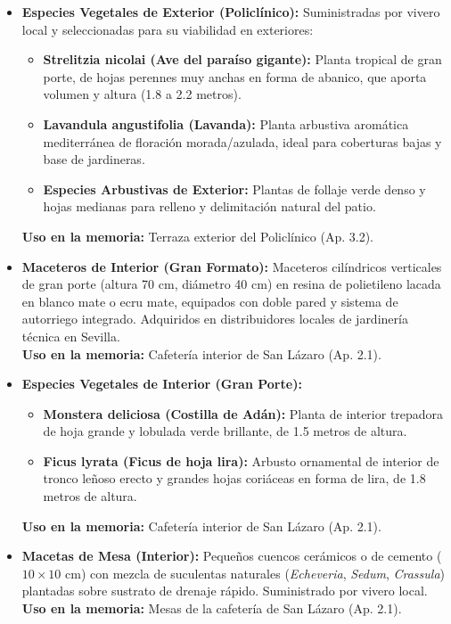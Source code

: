 \documentclass[12pt,a4paper]{article}
\begin{document}
\begin{itemize}
    \item \textbf{Especies Vegetales de Exterior (Policlínico):} Suministradas por vivero local y seleccionadas para su viabilidad en exteriores:
    \begin{itemize}
        \item \textbf{Strelitzia nicolai (Ave del paraíso gigante):} Planta tropical de gran porte, de hojas perennes muy anchas en forma de abanico, que aporta volumen y altura (1.8 a 2.2 metros).
        \item \textbf{Lavandula angustifolia (Lavanda):} Planta arbustiva aromática mediterránea de floración morada/azulada, ideal para coberturas bajas y base de jardineras.
        \item \textbf{Especies Arbustivas de Exterior:} Plantas de follaje verde denso y hojas medianas para relleno y delimitación natural del patio.
    \end{itemize}
    \textbf{Uso en la memoria:} Terraza exterior del Policlínico (Ap. 3.2).
    
    \item \textbf{Maceteros de Interior (Gran Formato):} Maceteros cilíndricos verticales de gran porte (altura 70 cm, diámetro 40 cm) en resina de polietileno lacada en blanco mate o ecru mate, equipados con doble pared y sistema de autorriego integrado. Adquiridos en distribuidores locales de jardinería técnica en Sevilla. \\ \textbf{Uso en la memoria:} Cafetería interior de San Lázaro (Ap. 2.1).
    
    \item \textbf{Especies Vegetales de Interior (Gran Porte):}
    \begin{itemize}
        \item \textbf{Monstera deliciosa (Costilla de Adán):} Planta de interior trepadora de hoja grande y lobulada verde brillante, de 1.5 metros de altura.
        \item \textbf{Ficus lyrata (Ficus de hoja lira):} Arbusto ornamental de interior de tronco leñoso erecto y grandes hojas coriáceas en forma de lira, de 1.8 metros de altura.
    \end{itemize}
    \textbf{Uso en la memoria:} Cafetería interior de San Lázaro (Ap. 2.1).
    
    \item \textbf{Macetas de Mesa (Interior):} Pequeños cuencos cerámicos o de cemento ($10 \times 10$ cm) con mezcla de suculentas naturales (\textit{Echeveria}, \textit{Sedum}, \textit{Crassula}) plantadas sobre sustrato de drenaje rápido. Suministrado por vivero local. \\ \textbf{Uso en la memoria:} Mesas de la cafetería de San Lázaro (Ap. 2.1).
    

\end{itemize}
\end{document}
